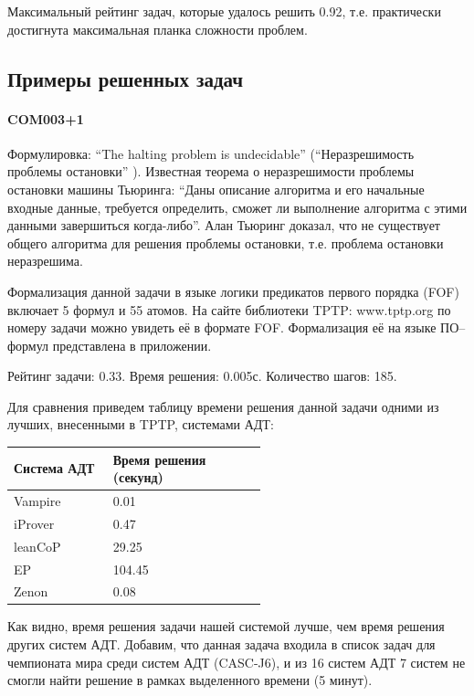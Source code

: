 Максимальный рейтинг задач, которые удалось решить 0.92, т.е. практически достигнута максимальная планка сложности проблем. 




\subsection{Примеры решенных задач}

\paragraph{COM003+1}
Формулировка: ``The halting problem is undecidable'' (``Неразрешимость проблемы остановки'' \cite{turing}). Известная теорема о неразрешимости проблемы остановки машины Тьюринга: ``Даны описание алгоритма и его начальные входные данные, требуется определить, сможет ли выполнение алгоритма с этими данными завершиться когда-либо''. Алан Тьюринг доказал, что не существует общего алгоритма для решения проблемы остановки, т.е. проблема остановки неразрешима.

Формализация данной задачи в языке логики предикатов первого порядка (FOF) включает 5 формул и 55 атомов. На сайте библиотеки TPTP: www.tptp.org по номеру задачи можно увидеть её в формате FOF. Формализация её на языке ПО--формул представлена в приложении.

Рейтинг задачи: 0.33. Время решения: 0.005с. Количество шагов: 185. 

Для сравнения приведем таблицу времени решения данной задачи одними из лучших, внесенными в TPTP, системами АДТ:

\begin{longtable}[H]{|p{0.2\linewidth}|p{0.35\linewidth}|}
\hline
\textbf{Система АДТ} & \textbf{Время решения (секунд)}  \\
\hline
Vampire & 0.01 \\
\hline
iProver & 0.47 \\
\hline
leanCoP & 29.25 \\
\hline
EP & 104.45  \\
\hline
Zenon & 0.08 \\
\hline
\end{longtable}


Как видно, время решения задачи нашей системой лучше, чем время решения других систем АДТ. Добавим, что данная задача входила в список задач для чемпионата мира среди систем АДТ (CASC-J6), и из 16 систем АДТ 7 систем не смогли найти решение в рамках выделенного времени (5 минут).

